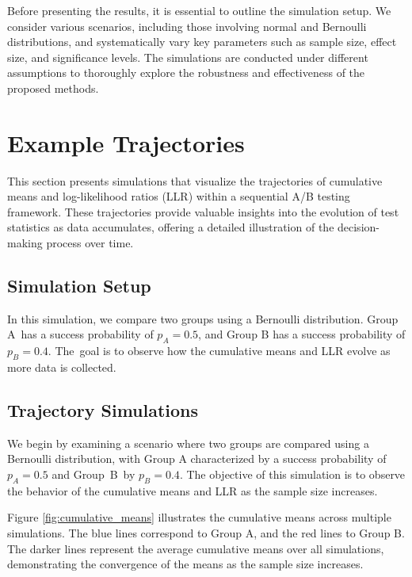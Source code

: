 \documentclass[magisterska, english]{pwr_wmat_praca_dyplomowa}
\theoremstyle{plain}
\numberwithin{theorem}{chapter}
\theoremstyle{definition}
\numberwithin{theorem}{chapter}
\begin{document}
Before presenting the results, it is essential to outline the simulation setup. We consider various scenarios, including those involving normal and Bernoulli distributions, and systematically vary key parameters such as sample size, effect size, and significance levels. The simulations are conducted under different assumptions to thoroughly explore the robustness and effectiveness of the proposed methods.
\section{Example Trajectories}

This section presents simulations that visualize the trajectories of cumulative means and log-likelihood ratios (LLR) within a sequential A/B testing framework. These trajectories provide valuable insights into the evolution of test statistics as data accumulates, offering a detailed illustration of the decision-making process over time.

\subsection{Simulation Setup}

In this simulation, we compare two groups using a Bernoulli distribution. Group A~has a success probability of \( p_A = 0.5 \), and Group B has a success probability of \( p_B = 0.4 \). The~goal is to observe how the cumulative means and LLR evolve as more data is collected.

\subsection{Trajectory Simulations}

We begin by examining a scenario where two groups are compared using a Bernoulli distribution, with Group A characterized by a success probability of \( p_A = 0.5 \) and Group~B~by \( p_B = 0.4 \). The objective of this simulation is to observe the behavior of the cumulative means and LLR as the sample size increases.

Figure \ref{fig:cumulative_means} illustrates the cumulative means across multiple simulations. The blue lines correspond to Group A, and the red lines to Group B. The darker lines represent the average cumulative means over all simulations, demonstrating the convergence of the means as the sample size increases.
\end{document}
